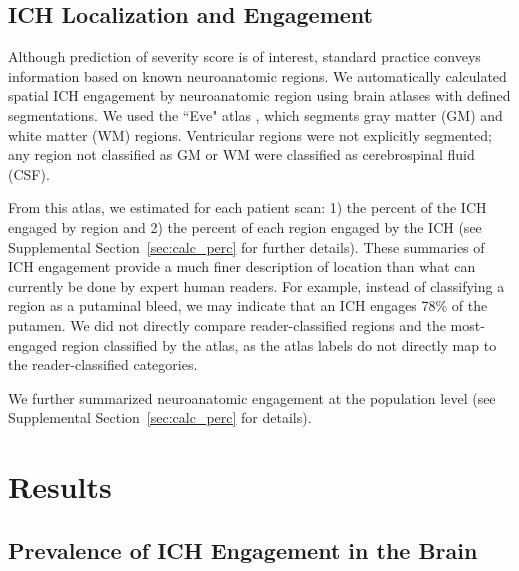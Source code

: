 \documentclass[10pt]{article}\usepackage[]{graphicx}\usepackage[]{color}
\begin{document}
\subsection{ICH Localization and Engagement}
\label{sec:engage}
Although prediction of severity score is of interest, standard practice conveys information based on known neuroanatomic regions.  We automatically calculated spatial ICH engagement by neuroanatomic region using brain atlases with defined segmentations.  
We used the ``Eve" atlas \citep{oishi_human_2008}, which segments  gray matter (GM) and white matter (WM) regions.  
Ventricular regions were not explicitly segmented; any region not classified as GM or WM were classified as cerebrospinal fluid (CSF).


From this atlas, we 
estimated for each patient scan: 1) the percent of the ICH engaged by region and 2) the percent of each region engaged by the ICH (see Supplemental Section~\ref{sec:calc_perc} for further details).
These summaries of ICH engagement provide a much finer description of location than what can currently be done by expert human readers.  For example, instead of classifying a region as a putaminal bleed, we may indicate that an ICH engages 78\% of the putamen.  We did not directly compare reader-classified regions and the most-engaged region classified by the atlas, as the atlas labels do not directly map to the reader-classified categories.

We further summarized neuroanatomic engagement at the population level (see Supplemental Section~\ref{sec:calc_perc} for details).  




\section{Results}

\subsection{Prevalence of ICH Engagement in the Brain}
\end{document}
